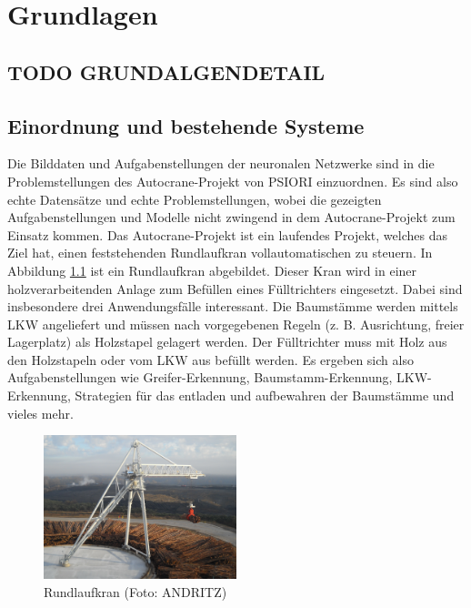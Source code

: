 \listoftodos



\chapter{Grundlagen}
\label{chap:Grundlagen}

	\section{TODO GRUNDALGENDETAIL}
	\label{sec:TODOGrundlagenDetail}
		
	\section{Einordnung und bestehende Systeme}
	\label{sec:BestehendesSystem}
	Die Bilddaten und Aufgabenstellungen der neuronalen Netzwerke sind in die Problemstellungen des Autocrane-Projekt von PSIORI einzuordnen. Es sind also echte Datensätze und echte Problemstellungen, wobei die gezeigten Aufgabenstellungen und Modelle nicht zwingend in dem Autocrane-Projekt zum Einsatz kommen. Das Autocrane-Projekt ist ein laufendes Projekt, welches das Ziel hat, einen feststehenden Rundlaufkran vollautomatischen zu steuern. In Abbildung \ref{img:CircularCrane} ist ein Rundlaufkran abgebildet. Dieser Kran wird in einer holzverarbeitenden Anlage zum Befüllen eines Fülltrichters eingesetzt. Dabei sind insbesondere drei Anwendungsfälle interessant. Die Baumstämme werden mittels LKW angeliefert und müssen nach vorgegebenen Regeln (z. B. Ausrichtung, freier Lagerplatz) als Holzstapel gelagert werden. Der Fülltrichter muss mit Holz aus den Holzstapeln oder vom LKW aus befüllt werden. Es ergeben sich also Aufgabenstellungen wie Greifer-Erkennung, Baumstamm-Erkennung, LKW-Erkennung, Strategien für das entladen und aufbewahren der Baumstämme und vieles mehr.	
	\begin{figure}[h]
		\centering
		\includegraphics[width=0.5\textwidth, center]{bilder/Grundlagen/Kran_vollstaendig_N1_030.jpg}
		\caption[Rund-Kran]{Rundlaufkran (Foto: ANDRITZ)}
		\label{img:CircularCrane}
	\end{figure}		
